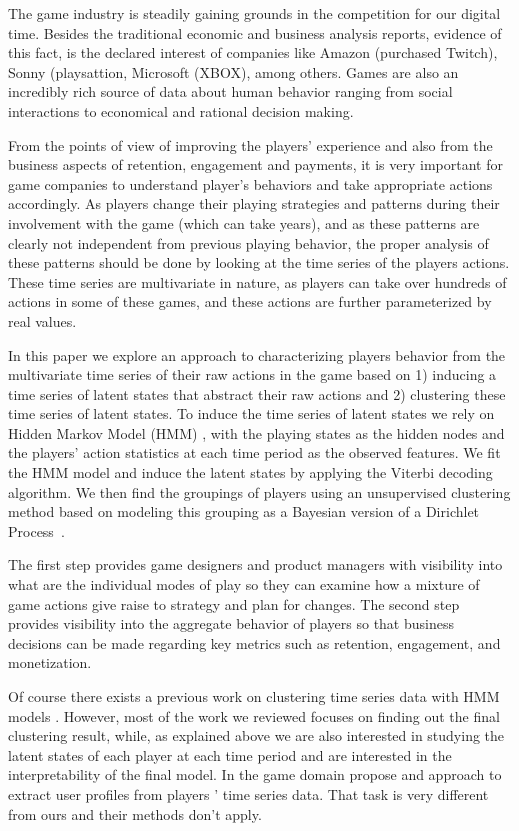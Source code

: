 The game industry is steadily gaining grounds in the competition for our digital time. Besides the traditional economic and business analysis reports, evidence of this fact, is the declared interest of companies like Amazon (purchased Twitch), Sonny (playsattion, Microsoft (XBOX), among others.  Games are also an incredibly rich source of data about human behavior ranging from social interactions to economical and rational decision making.

From the points of view of  improving the players' experience  and also from the business aspects of retention, engagement  and payments,  it is very important for game companies to understand  player's behaviors and take appropriate actions accordingly. As players change their playing strategies and patterns during their involvement with the game (which can take years), and as these patterns are clearly not independent from previous playing behavior, the proper analysis of these patterns should be done by looking at the time series of the players actions.  These time series are multivariate in nature, as players can take over hundreds of actions in some of these games, and these actions are further parameterized by real values.

In this paper we explore an approach to characterizing players behavior from the multivariate time series of their raw actions in the game based on 
1) inducing a time series of latent states that abstract their raw actions and 2) clustering these time series of latent states.  To induce the time series of latent states we rely on  Hidden Markov Model (HMM) \cite{hmm}, with the playing states as 
the hidden nodes and the players' action statistics at each time period as the observed features.  We fit the HMM model and induce the latent  states by applying the Viterbi decoding algorithm.  We then find the groupings of players using an unsupervised clustering method based on modeling this grouping as a Bayesian version of a Dirichlet Process~\cite{}.

The first step provides game designers and product managers with visibility into what are the individual modes of play so they can examine how a mixture of game actions give raise to strategy and plan for changes.  The second step provides visibility into the aggregate behavior of players so that business decisions can be made regarding key metrics such as retention, engagement, and monetization. 

Of course there exists a previous work on clustering time series data with HMM models
\cite{Bicego2006,bicego2003,coviello2014}. However, most of the work we reviewed focuses on finding
out the final clustering result, while, as explained above we are also interested in studying
the latent states of each player at each time period and are interested in the interpretability of the final model. In the game domain  \cite{menendez2014} propose and approach to extract user profiles from players ' time series data.   That task is very different from ours and their methods don't apply. 


